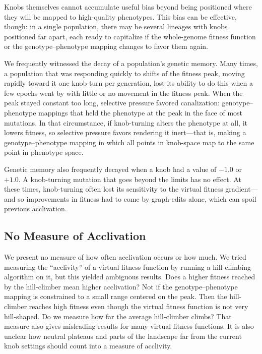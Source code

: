 \documentclass[letterpaper]{article}
\begin{document}
Knobs themselves cannot accumulate useful bias beyond being positioned where
they will be mapped to high-quality phenotypes. This bias can be effective,
though: in a single population, there may be several lineages with knobs
positioned far apart, each ready to capitalize if the whole-genome fitness
function or the genotype--phenotype mapping changes to favor them again.

We frequently witnessed the decay of a population's genetic
memory. Many times, a population that was responding quickly to shifts of the
fitness peak, moving rapidly toward it one knob-turn per generation, lost its
ability to do this when a few epochs went by with little or no movement in the
fitness peak. When the peak stayed constant too long, selective pressure
favored canalization: genotype--phenotype mappings that held the phenotype at
the peak in the face of most mutations. In that circumstance, if knob-turning
alters the phenotype at all, it lowers fitness, so selective pressure favors
rendering it inert---that is, making a genotype--phenotype mapping in which all
points in knob-space map to the same point in phenotype space.

Genetic memory also frequently decayed when a knob had a value of $-1.0$
or $+1.0$. A knob-turning mutation that goes beyond the
limits has no effect. At these times, knob-turning often lost its
sensitivity to the virtual fitness gradient---and so improvements in fitness
had to come by graph-edits alone, which can spoil previous acclivation. 

\subsection{No Measure of Acclivation}

We present no measure of how often acclivation occurs or how much. We tried
measuring the ``acclivity'' of a virtual fitness function by running a
hill-climbing algorithm on it, but this yielded ambiguous results. Does a
higher fitness reached by the hill-climber mean higher acclivation? Not if the
genotype--phenotype mapping is constrained to a small range centered on the
peak. Then the hill-climber reaches high fitness even though the virtual
fitness function is not very hill-shaped. Do we measure how far the average
hill-climber climbs?  That measure also gives misleading results for many
virtual fitness functions. It is also unclear how neutral plateaus
and parts of the landscape far from the current knob
settings should count into a measure of acclivity.
\end{document}
